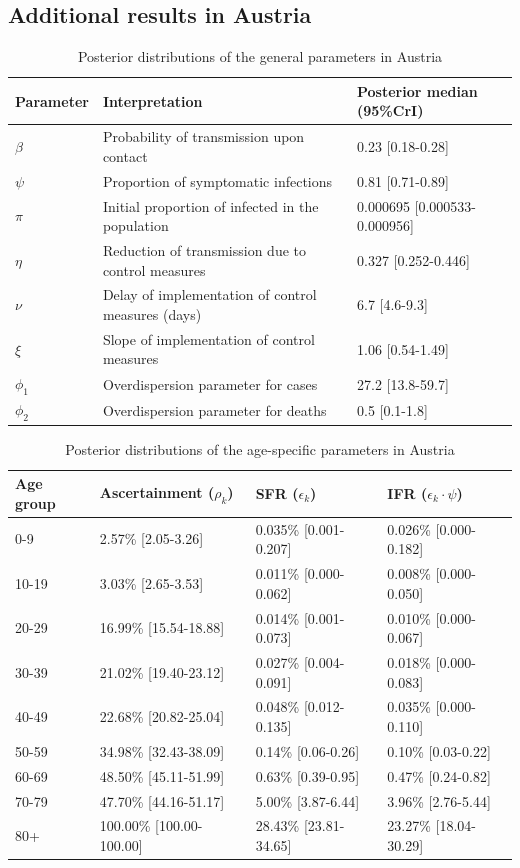 \documentclass{article}
\begin{document}
\subsection{Additional results in Austria}
\begin{table}[H]
	\centering
	\begin{tabular}{lll}
		\hline
		Parameter & Interpretation & Posterior median (95\%CrI) \\ 
		\hline
		$\beta$ & Probability of transmission upon contact & 0.23 [0.18-0.28] \\ 
		$\psi$ & Proportion of symptomatic infections & 0.81 [0.71-0.89] \\ 
		$\pi$ & Initial proportion of infected in the population & 0.000695 [0.000533-0.000956] \\ 
		$\eta$ & Reduction of transmission due to control measures & 0.327 [0.252-0.446] \\ 
		$\nu$ & Delay of implementation of control measures (days) & 6.7 [4.6-9.3] \\ 
		$\xi$ & Slope of implementation of control measures & 1.06 [0.54-1.49] \\ 
		$\phi_1$ & Overdispersion parameter for cases & 27.2 [13.8-59.7] \\ 
		$\phi_2$ & Overdispersion parameter for deaths & 0.5 [0.1-1.8] \\ 
		\hline
	\end{tabular}
	\caption{Posterior distributions of the general parameters in Austria} 
\end{table}
\begin{table}[H]
	\centering
	\begin{tabular}{llll}
		\hline
		Age group & Ascertainment ($\rho_k$) & SFR ($\epsilon_k$) & IFR ($\epsilon_k\cdot\psi$) \\ 
		\hline
		0-9 & 2.57\% [2.05-3.26] & 0.035\% [0.001-0.207] & 0.026\% [0.000-0.182] \\ 
		10-19 & 3.03\% [2.65-3.53] & 0.011\% [0.000-0.062] & 0.008\% [0.000-0.050] \\ 
		20-29 & 16.99\% [15.54-18.88] & 0.014\% [0.001-0.073] & 0.010\% [0.000-0.067] \\ 
		30-39 & 21.02\% [19.40-23.12] & 0.027\% [0.004-0.091] & 0.018\% [0.000-0.083] \\ 
		40-49 & 22.68\% [20.82-25.04] & 0.048\% [0.012-0.135] & 0.035\% [0.000-0.110] \\ 
		50-59 & 34.98\% [32.43-38.09] & 0.14\% [0.06-0.26] & 0.10\% [0.03-0.22] \\ 
		60-69 & 48.50\% [45.11-51.99] & 0.63\% [0.39-0.95] & 0.47\% [0.24-0.82] \\ 
		70-79 & 47.70\% [44.16-51.17] & 5.00\% [3.87-6.44] & 3.96\% [2.76-5.44] \\ 
		80+ & 100.00\% [100.00-100.00] & 28.43\% [23.81-34.65] & 23.27\% [18.04-30.29] \\ 
		\hline
	\end{tabular}
	\caption{Posterior distributions of the age-specific parameters in Austria} 
\end{table}
\clearpage
\end{document}
